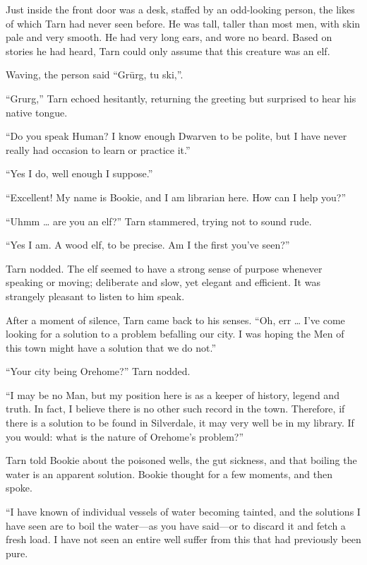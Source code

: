 Just inside the front door was a desk, staffed by an odd-looking person, the likes of which Tarn had never seen before.  He was tall, taller than most men, with skin pale and very smooth.  He had very long ears, and wore no beard.  Based on stories he had heard, Tarn could only assume that this creature was an elf.

Waving, the person said ``Gr\=urg, tu ski,''.

``Grurg,'' Tarn echoed hesitantly, returning the greeting but surprised to hear his native tongue.

``Do you speak Human?  I know enough Dwarven to be polite, but I have never really had occasion to learn or practice it.''

``Yes I do, well enough I suppose.''

``Excellent!  My name is Bookie, and I am librarian here.  How can I help you?''

``Uhmm \ldots{} are you an elf?'' Tarn stammered, trying not to sound rude.

``Yes I am.  A wood elf, to be precise.  Am I the first you've seen?''

Tarn nodded.  The elf seemed to have a strong sense of purpose whenever speaking or moving; deliberate and slow, yet elegant and efficient.  It was strangely pleasant to listen to him speak.

After a moment of silence, Tarn came back to his senses.  ``Oh, err \ldots{} I've come looking for a solution to a problem befalling our city.  I was hoping the Men of this town might have a solution that we do not.''

``Your city being Orehome?''  Tarn nodded.

``I may be no Man, but my position here is as a keeper of history, legend and truth.  In fact, I believe there is no other such record in the town.  Therefore, if there is a solution to be found in Silverdale, it may very well be in my library. If you would: what is the nature of Orehome's problem?''

Tarn told Bookie about the poisoned wells, the gut sickness, and that boiling the water is an apparent solution.  Bookie thought for a few moments, and then spoke.

``I have known of individual vessels of water becoming tainted, and the solutions I have seen are to boil the water---as you have said---or to discard it and fetch a fresh load.  I have not seen an entire well suffer from this that had previously been pure.

